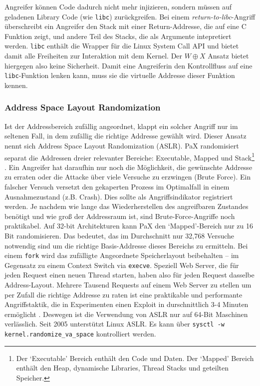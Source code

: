 Angreifer können Code dadurch nicht mehr injizieren, sondern müssen auf geladenen Library Code (wie \texttt{libc}) zurückgreifen. Bei einem \textit{return-to-libc}-Angriff überschreibt ein Angreifer den Stack mit einer Return-Addresse, die auf eine C Funktion zeigt, und andere Teil des Stacks, die als Argumente intepretiert werden. \texttt{libc} enthält die Wrapper für die Linux System Call API und bietet damit alle Freiheiten zur Interaktion mit dem Kernel. Der $W \oplus X$ Ansatz bietet hiergegen also keine Sicherheit. Damit eine Angreiferin den Kontrollfluss auf eine \texttt{libc}-Funktion lenken kann, muss sie die virtuelle Addresse dieser Funktion kennen.

\subsubsection{Address Space Layout Randomization}
\label{sec:aslr}

Ist der Addressbereich zufällig angeordnet, klappt ein solcher Angriff nur im seltenen Fall, in dem zufällig die richtige Addresse gewählt wird. Dieser Ansatz nennt sich Address Space Layout Randomization (ASLR). PaX randomisiert separat die Addressen dreier relevanter Bereiche: Executable, Mapped und Stack\footnote{Der `Executable' Bereich  enthält den
Code und Daten. Der `Mapped' Bereich enthält den Heap, dynamische Libraries, Thread Stacks und geteilten Speicher.} \cite{pax-aslr}.
Ein Angreifer hat daraufhin nur noch die Möglichkeit, die gewünschte Addresse zu erraten oder die Attacke über viele Versuche zu erzwingen (Brute Force). Ein falscher Versuch versetzt den gekaperten Prozess im Optimalfall in einem Ausnahmezustand (z.B. Crash). Dies sollte als Angriffsindikator registriert werden. Je nachdem wie lange das Wiederherstellen des
angreifbaren Zustandes benötigt und wie groß der Addressraum ist, sind Brute-Force-Angriffe noch praktikabel. Auf 32-bit Architekturen kann PaX den `Mapped'-Bereich nur zu 16 Bit randomisieren. Das bedeutet, das im Durchschnitt nur 32,768 Versuche notwendig sind um die richtige Basis-Addresse dieses Bereichs zu ermitteln. Bei einem \texttt{fork} wird das zufälligte Angeordnete Speicherlayout beibehalten -- im Gegensatz zu einem Context Switch via \texttt{execve}. Speziell Web Server,
die für jeden Request einen neuen Thread starten, haben also für jeden Request dasselbe Address-Layout. Mehrere Tausend Requests auf einem Web Server zu stellen um per Zufall die richtige Addresse zu raten ist eine praktikable und performante Angriffstaktik, die in Experimenten einen Exploit in durschnittlich 3-4 Minuten ermöglicht \cite{shacham_2004}.
Deswegen ist die Verwendung von ASLR nur auf 64-Bit Maschinen verlässlich.
Seit 2005 unterstützt Linux ASLR. Es kann über \texttt{sysctl -w kernel.randomize\_va\_space} kontrolliert werden.

